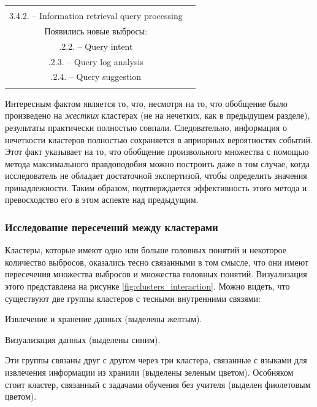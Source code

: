 \documentclass[12pt]{article}
\newenvironment{itemize*}%
{\begin{itemize}%
	\setlength{\itemsep}{0pt}%
	\setlength{\parskip}{0pt}}%
{\end{itemize}}
\begin{document}
\begin{center}
{\begin{longtable}{|c|c|}
{				Пропало головное понятие:\\
				3.4.2. -- Information retrieval query processing \vspace{0.2cm}\\
				Появились новые выбросы:\\
				\offshoot 3.4.2.2. -- Query intent\\
				\offshoot3.4.2.3. -- Query log analysis\\
				\offshoot3.4.2.4. -- Query suggestion\\
			}  \\ 
			\hline 
	\end{longtable} }
\end{center}

Интересным фактом является то, что, несмотря на то, что обобщение было произведено на \emph{жестких} кластерах (не на нечетких, как в предыдущем разделе), результаты практически полностью совпали. Следовательно, информация о нечеткости кластеров полностью сохраняется в априорных вероятностях событий. Этот факт указывает на то, что обобщение произвольного множества с помощью метода максимального правдоподобия можно построить даже в том случае, когда исследователь не обладает достаточной экспертизой, чтобы определить значения принадлежности. Таким образом, подтверждается эффективность этого метода и превосходство его в этом аспекте над предыдущим.

\subsubsection{Исследование пересечений между кластерами}

Кластеры, которые имеют одно или больше головных понятий и некоторое количество выбросов, оказались тесно связанными в том смысле, что они имеют пересечения множества выбросов и множества головных понятий. Визуализация этого представлена на рисунке \ref{fig:clusters_interaction}. Можно видеть, что существуют две группы кластеров с тесными внутренними связями:
\begin{itemize*}
	\item Извлечение и хранение данных (выделены желтым).
	\item Визуализация данных (выделены синим).
\end{itemize*}
Эти группы связаны друг с другом через три кластера, связанные с языками для извлечения информации из хранили (выделены зеленым цветом). Особняком стоит кластер, связанный с задачами обучения без учителя (выделен фиолетовым цветом).
\end{document}
